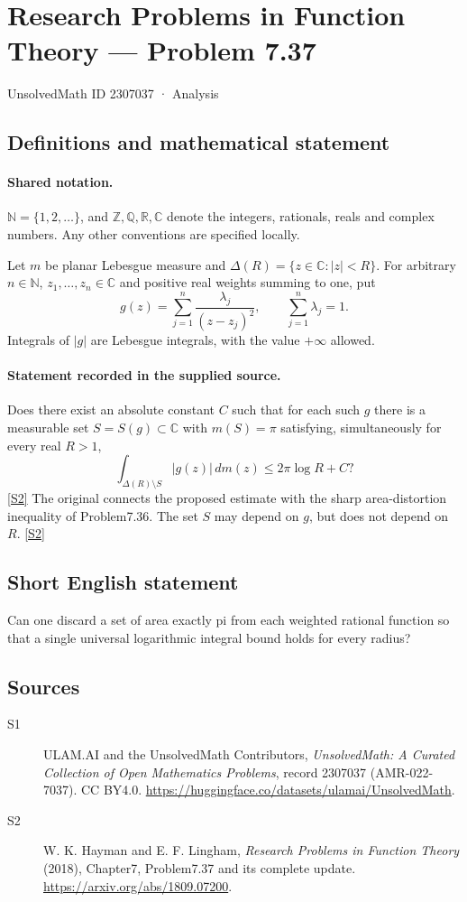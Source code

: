 \documentclass[11pt]{article}
\newcommand{\sref}[2]{\hyperlink{source:#1:#2}{[S#2]}}
\begin{document}
\setcounter{section}{2307036}
\section{Research Problems in Function Theory — Problem 7.37}\label{2307037}
{\small\sffamily UnsolvedMath ID 2307037 · Analysis}
\subsection{Definitions and mathematical statement}

\paragraph{Shared notation.}$\mathbb N=\{1,2,\ldots\}$, and $\mathbb Z,\mathbb Q,\mathbb R,\mathbb C$ denote the integers, rationals, reals and complex numbers. Any other conventions are specified locally.


Let $m$ be planar Lebesgue measure and $\Delta(R)=\{z\in\mathbb C:|z|<R\}$. For arbitrary $n\in\mathbb N$, $z_1,\ldots,z_n\in\mathbb C$ and positive real weights summing to one, put
\[g(z)=\sum_{j=1}^n\frac{\lambda_j}{(z-z_j)^2},\qquad \sum_{j=1}^n\lambda_j=1.\]
Integrals of $|g|$ are Lebesgue integrals, with the value $+\infty$ allowed.

\paragraph{Statement recorded in the supplied source.}
Does there exist an absolute constant $C$ such that for each such $g$ there is a measurable set $S=S(g)\subset\mathbb C$ with $m(S)=\pi$ satisfying, simultaneously for every real $R>1$,
\[\int_{\Delta(R)\setminus S}|g(z)|\,dm(z)\le2\pi\log R+C?\] \sref{2307037}{2}
The original connects the proposed estimate with the sharp area-distortion inequality of Problem7.36. The set $S$ may depend on $g$, but does not depend on $R$. \sref{2307037}{2}
\subsection{Short English statement}
Can one discard a set of area exactly pi from each weighted rational function so that a single universal logarithmic integral bound holds for every radius?
\subsection{Sources}
\begin{description}
\item[\hypertarget{source:2307037:1}{S1}] ULAM.AI and the UnsolvedMath Contributors, \emph{UnsolvedMath: A Curated Collection of Open Mathematics Problems}, record 2307037 (AMR-022-7037). CC BY4.0. \url{https://huggingface.co/datasets/ulamai/UnsolvedMath}.
\item[\hypertarget{source:2307037:2}{S2}] W. K. Hayman and E. F. Lingham, \emph{Research Problems in Function Theory} (2018), Chapter7, Problem7.37 and its complete update. \url{https://arxiv.org/abs/1809.07200}.
\end{description}
\label{end:2307037}
\end{document}
